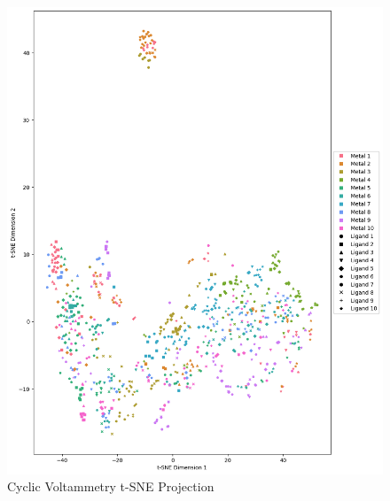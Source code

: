 \begin{figure}[h!]
  \centering
    \includegraphics[width=1.0\textwidth]{figures/cv_tsne.png}
    \caption{Cyclic Voltammetry t-SNE Projection}
    \label{cv-tsne}
\end{figure}
